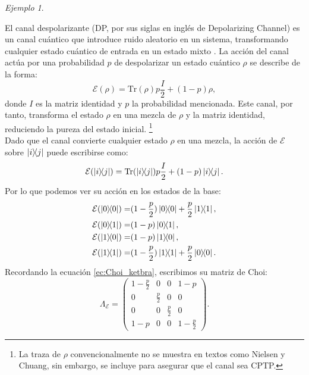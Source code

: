 \documentclass[letterpaper,12pt]{thesisECFM}
\theoremstyle{plain}
\theoremstyle{definition}
\theoremstyle{definition}
\theoremstyle{remark}
\newcommand{\1}{\mathbb{1}}
\newtheorem{ex}{Ejemplo}[section]
\begin{document}
\begin{ex} \label{Ejemplo 1.0.1} 
\end{ex}
El canal despolarizante  (DP, por sus siglas en inglés de Depolarizing Channel)  es un canal cuántico que introduce ruido aleatorio en un sistema, transformando cualquier estado cuántico de entrada en un estado mixto \cite{nielsen_chuang_2011}. La acción del canal actúa por una probabilidad $p$ de despolarizar un estado cuántico $\rho$ se describe de la forma:
\begin{equation} \label{ec:superop_depolarizing}
\mathcal{E}(\rho) = \text{Tr}(\rho) p  \frac{I}{2}   + (1 - p)\rho ,
\end{equation}
donde $I$ es la matriz identidad y $p$ la probabilidad mencionada. Este canal, por tanto, transforma el estado $\rho$ en una mezcla de $\rho$ y la matriz identidad, reduciendo la pureza del estado inicial. \footnote{La traza de $\rho$ convencionalmente no se muestra en textos como Nielsen y Chuang, sin embargo,  se incluye para asegurar que el canal sea CPTP.}\\
Dado que el canal  convierte cualquier estado $\rho$ en una mezcla, la acción de $\mathcal{E}$ sobre $\ketbra{i}{j}$ puede escribirse como:
\begin{equation}
\mathcal{E}(\ketbra{i}{j}) = \text{Tr}(\ketbra{i}{j})  p \frac{I}{2}+ (1 - p) \ketbra{i}{j}.
\end{equation}
Por lo que podemos ver su acción en los estados de la base:
\begin{alignat*}{2}
     \mathcal{E}( \ketbra{0}) = & (1 - \frac{p}{2} ) \ketbra{0} + \frac{p}{2} \ketbra{1}, \\
     \mathcal{E}( \ketbra{0}{1}) = & (1 - p ) \ketbra{0}{1},\\
      \mathcal{E}( \ketbra{1}{0}) = & (1 - p ) \ketbra{1}{0},\\
           \mathcal{E}( \ketbra{1}) = & (1 - \frac{p}{2} ) \ketbra{1} + \frac{p}{2} \ketbra{0}.
\end{alignat*}
Recordando la ecuación \ref{ec:Choi_ketbra}, escribimos su matriz de Choi:
\begin{equation}\label{ec:choi_depolarizing}
    \Lambda_\mathcal{E} = 
\begin{pmatrix}
1 - \frac{p}{2} & 0 & 0 & 1 - p \\
0 & \frac{p}{2} & 0 & 0 \\
0 & 0 & \frac{p}{2} & 0 \\
1 - p & 0 & 0 & 1 - \frac{p}{2}
\end{pmatrix}.
\end{equation}
\end{document}
